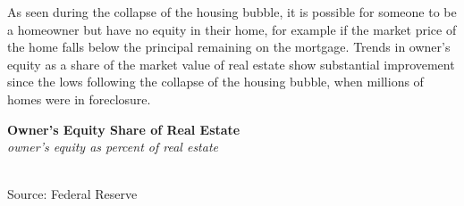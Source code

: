 \documentclass{report}
\makeatletter
\newcommand{\tbllink}[1]{\href{https://raw.githubusercontent.com/bdecon/US-chartbook/master/chartbook/data/#1}{\faTable}}
\newcommand*\short[1]{\expandafter\@gobbletwo\number\numexpr#1\relax}
\newcommand{\shdateaxisticks}{
		date coordinates in=x, axis line style={draw=none},
		xmax={2021-06-15},
		max space between ticks=40,	    
		xtick={{1990-01-01}, {1995-01-01}, {2000-01-01}, 
			{2005-01-01}, {2010-01-01}, {2015-01-01}, {2020-01-01}},
		minor xtick={},
		enlarge y limits={0.06}, enlarge x limits={0.01},
		}
\newcommand{\stdline}[4]{\addplot[very thick, no markers, color=#1] 
		table [x=#2, y=#3, col sep=comma] {#4};	}
\newcommand{\rbars}{
		\fill[color=black!10] (axis cs:{1990-07-01},\pgfkeysvalueof{/pgfplots/ymin}) rectangle 
			(axis cs:{1991-03-01}, \pgfkeysvalueof{/pgfplots/ymax});
		\fill[color=black!10] (axis cs:{2007-12-01},\pgfkeysvalueof{/pgfplots/ymin}) rectangle 
			(axis cs:{2009-07-01}, \pgfkeysvalueof{/pgfplots/ymax});
		\fill[color=black!10] (axis cs:{2001-03-01},\pgfkeysvalueof{/pgfplots/ymin}) rectangle 
			(axis cs:{2001-11-01}, \pgfkeysvalueof{/pgfplots/ymax});
		\fill[color=black!10] (axis cs:{2020-02-01},\pgfkeysvalueof{/pgfplots/ymin}) rectangle 
			(axis cs:{2021-06-15}, \pgfkeysvalueof{/pgfplots/ymax});}
\makeatother
\begin{document}
{\begin{minipage}{0.76\textwidth}
As seen during the collapse of the housing bubble, it is possible for someone to be a homeowner but have no equity in their home, for example if the market price of the home falls below the principal remaining on the mortgage. Trends in owner's equity as a share of the market value of real estate show substantial improvement since the lows following the collapse of the housing bubble, when millions of homes were in foreclosure. 
\end{minipage}
\vspace{1mm}

\begin{minipage}{0.29\textwidth}
\small 
\end{minipage}\hspace{7mm}
\begin{minipage}{0.46\textwidth}
\normalsize \textbf{Owner's Equity Share of Real Estate}\\
\footnotesize{\textit{owner's equity as percent of real estate}}\\
\hspace*{-2mm} \\
\footnotesize{Source: Federal Reserve} \hspace{30mm} \tbllink{homeeq.csv} 

\end{minipage}
\newpage
\begin{minipage}{0.76\textwidth}

\end{minipage}}
\end{document}
